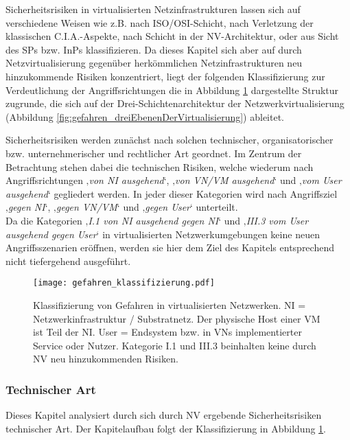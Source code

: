 Sicherheitsrisiken in virtualisierten Netzinfrastrukturen lassen sich auf verschiedene Weisen wie z.B. nach ISO/OSI-Schicht, nach Verletzung der klassischen C.I.A.-Aspekte, nach Schicht in der NV-Architektur, oder aus Sicht des SPs bzw. InPs klassifizieren. Da dieses Kapitel sich aber auf durch Netzvirtualisierung gegenüber herkömmlichen Netzinfrastrukturen neu hinzukommende Risiken konzentriert, liegt der folgenden Klassifizierung zur Verdeutlichung der Angriffsrichtungen die in Abbildung \ref{fig:gefahren_klassifizierung} dargestellte Struktur zugrunde, die sich auf der Drei-Schichtenarchitektur der Netzwerkvirtualisierung (Abbildung \ref{fig:gefahren_dreiEbenenDerVirtualisierung}) ableitet.

Sicherheitsrisiken werden zunächst nach solchen technischer, organisatorischer bzw. unternehmerischer und rechtlicher Art geordnet. Im Zentrum der Betrachtung stehen dabei die technischen Risiken, welche wiederum nach Angriffsrichtungen ‚\textit{von NI ausgehend}‘, ‚\textit{von VN/VM ausgehend}‘ und ‚\textit{vom User ausgehend}‘ gegliedert werden. In jeder dieser Kategorien wird nach Angriffsziel ‚\textit{gegen NI}‘, ‚\textit{gegen VN/VM}‘ und ‚\textit{gegen User}‘ unterteilt. \\
Da die Kategorien ‚\textit{I.1 von NI ausgehend gegen NI}‘ und ‚\textit{III.3 vom User ausgehend gegen User}‘ in virtualisierten Netzwerkumgebungen keine neuen Angriffsszenarien eröffnen, werden sie hier dem Ziel des Kapitels entsprechend nicht tiefergehend ausgeführt. 


\begin{figure}[htb]
	\begin{center}
	\texttt{[image: gefahren\_klassifizierung.pdf]}
	\caption{\label{fig:gefahren_klassifizierung} Klassifizierung von Gefahren in virtualisierten Netzwerken. 
		\newline NI = Netzwerkinfrastruktur / Substratnetz. Der physische Host einer VM ist Teil der NI.
		\newline User = Endsystem bzw. in VNs implementierter Service oder Nutzer.
		\newline Kategorie I.1 und III.3 beinhalten keine durch NV neu hinzukommenden Risiken.}
	\end{center}
\end{figure}





\subsubsection{Technischer Art}
\label{subsubsec:gefahren_virt_technisch}
Dieses Kapitel analysiert durch sich durch NV ergebende Sicherheitsrisiken technischer Art.
Der Kapitelaufbau folgt der Klassifizierung in Abbildung \ref{fig:gefahren_klassifizierung}. 


